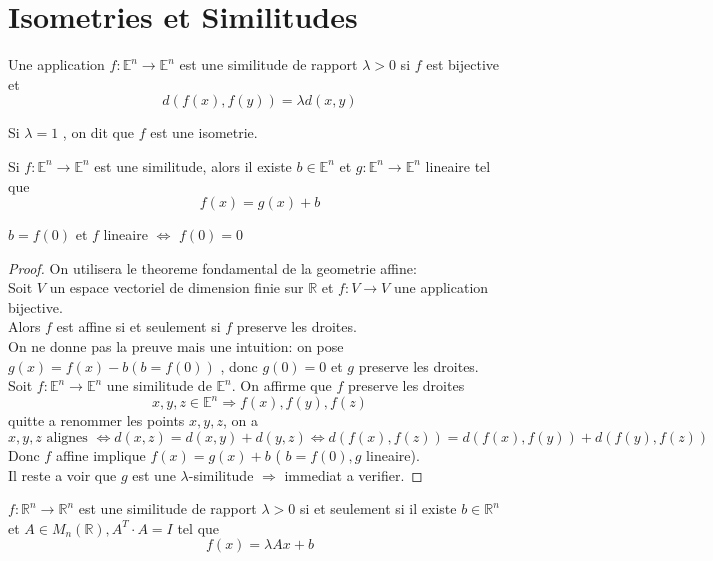\documentclass[../main.tex]{subfiles}
\begin{document}
\section{Isometries et Similitudes}
\begin{defn}[similitude]
Une application $f: \mathbb{E}^{n}\to \mathbb{E}^{n}$ est une similitude de rapport $\lambda>0$ si $f$ est bijective et
\[ 
	d( f( x) ,f( y) ) = \lambda d( x,y) 
\]

\end{defn}
Si $\lambda=1$ , on dit que $f$ est une isometrie.
\begin{thm}
	Si $f: \mathbb{E}^{n}\to \mathbb{E}^{n}$ est une similitude, alors il existe $b \in \mathbb{E}^{n}$ et $g: \mathbb{E}^{n}\to \mathbb{E}^{n}$ lineaire tel que
	\[ 
		f( x) = g( x) +b
	\]
	
\end{thm}
\begin{rmq}
	$b= f( 0) $ et $f$ lineaire $\iff$ $f( 0)=0 $ 
\end{rmq}
\begin{proof}
On utilisera le theoreme fondamental de la geometrie affine:\\
Soit $V$ un espace vectoriel de dimension finie sur $\mathbb{R}$ et $f:V \to V$ une application bijective.\\
Alors $f$ est affine si et seulement si $f$ preserve les droites.\\
On ne donne pas la preuve mais une intuition: on pose $g( x) = f( x) -b ( b= f( 0) ) $ , donc $g( 0) =0$ et $g$ preserve les droites.\\
Soit $f: \mathbb{E}^{n}\to \mathbb{E}^{n}$ une similitude de $ \mathbb{E}^{n}$. On affirme que $f$ preserve les droites
\[ 
	x,y,z \in \mathbb{E}^{n} \Rightarrow f( x) , f( y) ,f( z) 
\]
quitte a renommer les points $x,y,z$, on a 
\[ 
	x,y,z \text{ alignes } \iff d( x,z) = d( x,y) + d( y,z) \iff d( f( x), f( z) ) = d( f( x), f( y) ) + d( f( y) ,f( z) ) 
\]
Donc $f$ affine implique $f( x) =g( x) +b$ ( $b=f( 0) ,g $ lineaire).\\
Il reste a voir que $g$ est une $\lambda$-similitude $\Rightarrow$ immediat a verifier. 	
\end{proof}
\begin{crly}
	$f: \mathbb{R}^n \to \mathbb{R}^n$ est une similitude de rapport $\lambda>0$ si et seulement si il existe $b \in \mathbb{R}^n$ et $A \in M_n( \mathbb{R}) , A^{T}\cdot A = I $ tel que
	\[ 
		f( x) =\lambda Ax +b	
	\]
\end{crly}
\end{document}
